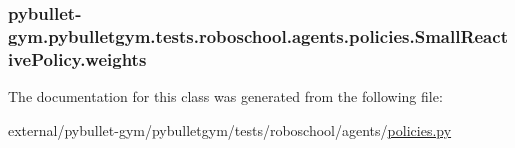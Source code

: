 \subsubsection[{\texorpdfstring{weights}{weights}}]{\setlength{\rightskip}{0pt plus 5cm}pybullet-\/gym.\+pybulletgym.\+tests.\+roboschool.\+agents.\+policies.\+Small\+Reactive\+Policy.\+weights}\hypertarget{classpybullet-gym_1_1pybulletgym_1_1tests_1_1roboschool_1_1agents_1_1policies_1_1_small_reactive_policy_a5960d953ee07f9974eae87d16291576a}{}\label{classpybullet-gym_1_1pybulletgym_1_1tests_1_1roboschool_1_1agents_1_1policies_1_1_small_reactive_policy_a5960d953ee07f9974eae87d16291576a}


The documentation for this class was generated from the following file\+:\begin{DoxyCompactItemize}
\item 
external/pybullet-\/gym/pybulletgym/tests/roboschool/agents/\hyperlink{policies_8py}{policies.\+py}\end{DoxyCompactItemize}
